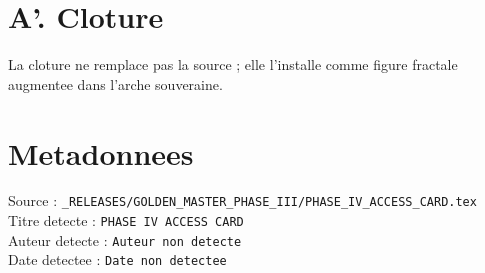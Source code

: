 \documentclass[11pt,a4paper]{article}
\begin{document}
\section*{A'. Cloture}
La cloture ne remplace pas la source ; elle l'installe comme figure fractale augmentee dans l'arche souveraine.

\section*{Metadonnees}
Source : \texttt{_RELEASES/GOLDEN_MASTER_PHASE_III/PHASE_IV_ACCESS_CARD.tex}\\
Titre detecte : \texttt{PHASE IV ACCESS CARD}\\
Auteur detecte : \texttt{Auteur non detecte}\\
Date detectee : \texttt{Date non detectee}
\end{document}
